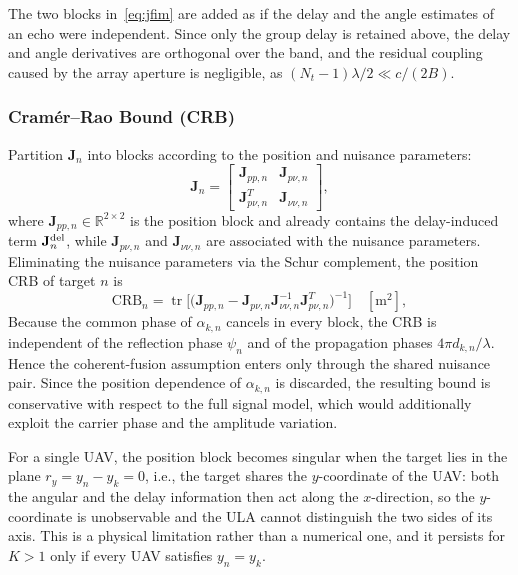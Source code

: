 \documentclass[conference]{IEEEtran}
\begin{document}
The two blocks in~\eqref{eq:jfim} are added as if the delay and the angle estimates of an echo were independent. Since only the group delay is retained above, the delay and angle derivatives are orthogonal over the band, and the residual coupling caused by the array aperture is negligible, as $(N_t-1)\lambda/2\ll c/(2B)$.

\subsubsection{Cram\'er--Rao Bound (CRB)}

Partition $\mathbf J_n$ into blocks according to the position and nuisance parameters:
\begin{equation}
\mathbf J_n=\begin{bmatrix}\mathbf J_{pp,n} & \mathbf J_{p\nu,n}\\ \mathbf J_{p\nu,n}^T & \mathbf J_{\nu\nu,n}\end{bmatrix},
\end{equation}
where $\mathbf J_{pp,n}\in\mathbb R^{2\times2}$ is the position block and already contains the delay-induced term $\mathbf J^{\rm del}_n$, while $\mathbf J_{p\nu,n}$ and $\mathbf J_{\nu\nu,n}$ are associated with the nuisance parameters. Eliminating the nuisance parameters via the Schur complement, the position CRB of target $n$ is
\begin{equation}\label{eq:crb}
\mathrm{CRB}_n=\operatorname{tr}\!\Big[\big(\mathbf J_{pp,n}-\mathbf J_{p\nu,n}\mathbf J_{\nu\nu,n}^{-1}\mathbf J_{p\nu,n}^T\big)^{-1}\Big]\quad[\mathrm{m}^2],
\end{equation}
Because the common phase of $\alpha_{k,n}$ cancels in every block, the CRB is independent of the reflection phase $\psi_n$ and of the propagation phases $4\pi d_{k,n}/\lambda$. Hence the coherent-fusion assumption enters only through the shared nuisance pair. Since the position dependence of $\alpha_{k,n}$ is discarded, the resulting bound is conservative with respect to the full signal model, which would additionally exploit the carrier phase and the amplitude variation.

For a single UAV, the position block becomes singular when the target lies in the plane $r_y=y_n-y_k=0$, i.e., the target shares the $y$-coordinate of the UAV: both the angular and the delay information then act along the $x$-direction, so the $y$-coordinate is unobservable and the ULA cannot distinguish the two sides of its axis. This is a physical limitation rather than a numerical one, and it persists for $K>1$ only if every UAV satisfies $y_n=y_k$.
\end{document}
